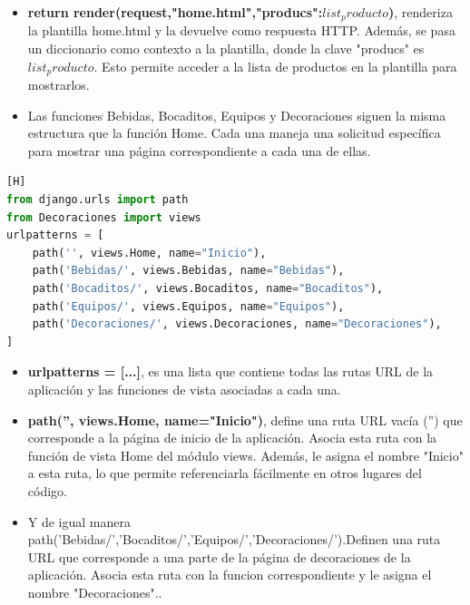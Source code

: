 \documentclass{article}
\begin{document}
\begin{itemize}
\begin{itemize}
        \item \textbf{return render(request,"home.html",{"producs":$list_producto$})}, renderiza la plantilla home.html y la devuelve como respuesta HTTP. Además, se pasa un diccionario como contexto a la plantilla, donde la clave "producs" es $list_producto$. Esto permite acceder a la lista de productos en la plantilla para mostrarlos.
        \item Las funciones Bebidas, Bocaditos, Equipos y Decoraciones siguen la misma estructura que la función Home. Cada una maneja una solicitud específica para mostrar una página correspondiente a cada una de ellas.
    \end{itemize}
	\begin{lstlisting}[language=python,caption={Decoraciones/urls.py}][H]
from django.urls import path
from Decoraciones import views
urlpatterns = [
    path('', views.Home, name="Inicio"),
    path('Bebidas/', views.Bebidas, name="Bebidas"),
    path('Bocaditos/', views.Bocaditos, name="Bocaditos"),
    path('Equipos/', views.Equipos, name="Equipos"),
    path('Decoraciones/', views.Decoraciones, name="Decoraciones"),
]
    \end{lstlisting}
	\begin{itemize}
	    \item \textbf{urlpatterns = [...]}, es una lista que contiene todas las rutas URL de la aplicación y las funciones de vista asociadas a cada una.
        \item \textbf{path('', views.Home, name="Inicio")}, define una ruta URL vacía ('') que corresponde a la página de inicio de la aplicación. Asocia esta ruta con la función de vista Home del módulo views. Además, le asigna el nombre "Inicio" a esta ruta, lo que permite referenciarla fácilmente en otros lugares del código.
        \item Y de igual manera path('Bebidas/','Bocaditos/','Equipos/','Decoraciones/').Definen una ruta URL que corresponde a una parte de la página de decoraciones de la aplicación. Asocia esta ruta con la funcion correspondiente y le asigna el nombre "Decoraciones"..
    \end{itemize}

\end{itemize}
\end{document}

